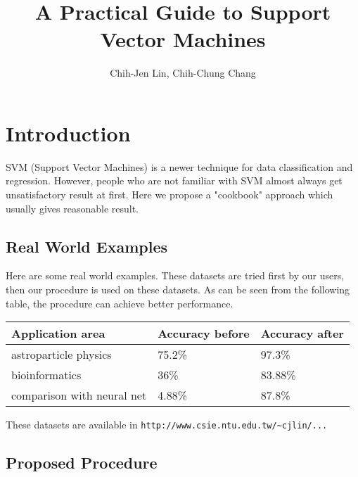 \documentclass[12pt]{article}
\title{A Practical Guide to Support Vector Machines}
\author{Chih-Jen Lin, Chih-Chung Chang}
\begin{document}
 
\maketitle

\section{Introduction}

SVM (Support Vector Machines) is a newer technique for data
classification and regression. However, people who are not 
familiar with SVM almost always get unsatisfactory result 
at first. Here we propose a "cookbook" approach which usually 
gives reasonable result.

\subsection{Real World Examples}

Here are some real world examples. These datasets are
tried first by our users, then our procedure is used
on these datasets. As can be seen from the following 
table, the procedure can achieve better performance.

\vspace{0.5cm}
\begin{tabular}{l|l|l}
Application area & Accuracy before & Accuracy after \\
\hline

astroparticle physics \footnotemark[1] & 75.2\% & 97.3\% \\

bioinformatics \footnotemark[2] & 36\% & 83.88\% \\

comparison with neural net \footnotemark[3] & 4.88\% & 87.8\% \\

\end{tabular}


\vspace{0.5cm}
These datasets are available in {\tt http://www.csie.ntu.edu.tw/\~\/cjlin/...}

\subsection{Proposed Procedure}
\end{document}
